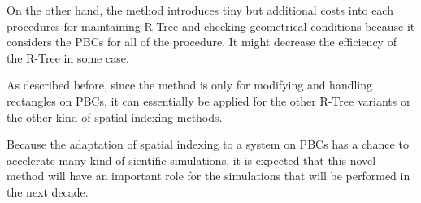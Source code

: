 \documentclass[10pt,letterpaper,twocolumn]{article}
\begin{document}
On the other hand, the method introduces tiny but additional costs into each
procedures for maintaining R-Tree and checking geometrical conditions because it
considers the PBCs for all of the procedure. It might decrease the efficiency of
the R-Tree in some case.

As described before, since the method is only for modifying and handling
rectangles on PBCs, it can essentially be applied for the other R-Tree variants
or the other kind of spatial indexing methods.

Because the adaptation of spatial indexing to a system on PBCs has a chance to
accelerate many kind of sientific simulations, it is expected that this novel
method will have an important role for the simulations that will be performed in
the next decade.


{}
\end{document}
